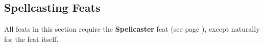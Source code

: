 \subsection*{Spellcasting Feats}
All feats in this section require the \textbf{Spellcaster} feat (see page \pageref{feat::spellcaster}), except naturally for the feat itself.


